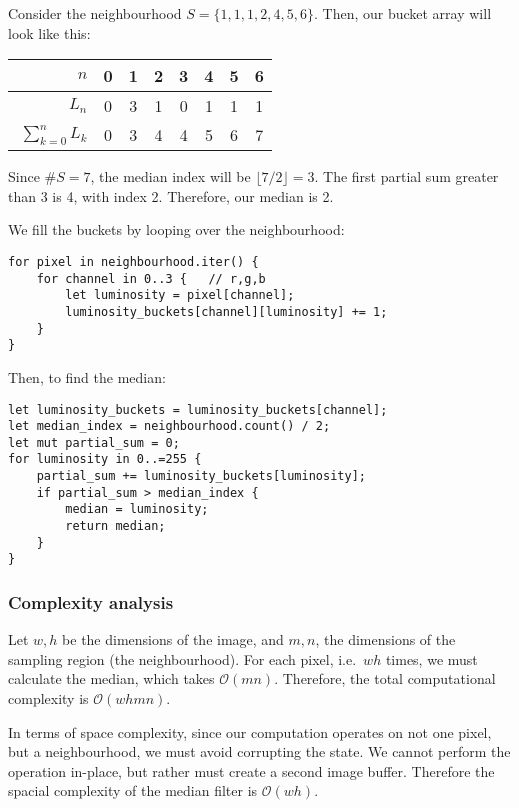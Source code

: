 \documentclass[12pt]{article}
\begin{document}
\begin{example}
    Consider the neighbourhood $S = \{1,1,1,2,4,5,6\}$.
    Then, our bucket array will look like this:
    \begin{table}[H]\centering
        \begin{tabular}{|r|c|c|c|c|c|c|c|}
            \hline
            $\phantom{\big|}n$                & 0 & 1 & 2 & 3 & 4 & 5 & 6 \\ \hline
            $\phantom{\big|}L_n$              & 0 & 3 & 1 & 0 & 1 & 1 & 1 \\ \hline\hline
            $\phantom{\Big|}\sum_{k=0}^n L_k$ & 0 & 3 & 4 & 4 & 5 & 6 & 7 \\
            \hline
        \end{tabular}
    \end{table}
    Since $\#S = 7$, the median index will be $\lfloor 7/2 \rfloor = 3$.
    The first partial sum greater than 3 is 4, with index 2. Therefore, our median is 2.
\end{example}

We fill the buckets by looping over the neighbourhood:
\begin{lstlisting}
for pixel in neighbourhood.iter() {
    for channel in 0..3 {   // r,g,b
        let luminosity = pixel[channel];
        luminosity_buckets[channel][luminosity] += 1;
    }
}
\end{lstlisting}

Then, to find the median:
\begin{lstlisting}
let luminosity_buckets = luminosity_buckets[channel];
let median_index = neighbourhood.count() / 2;
let mut partial_sum = 0;
for luminosity in 0..=255 {
    partial_sum += luminosity_buckets[luminosity];
    if partial_sum > median_index {
        median = luminosity;
        return median;
    }
}

\end{lstlisting}


\subsubsection{Complexity analysis}

Let $w,h$ be the dimensions of the image, and $m,n$, the dimensions of the sampling region (the neighbourhood).
For each pixel, i.e.\ $wh$ times, we must calculate the median, which takes $\mathcal{O}(mn)$.
Therefore, the total computational complexity is $\mathcal{O}(whmn)$.

In terms of space complexity, since our computation operates on not one pixel, but a neighbourhood, we must avoid corrupting the state.
We cannot perform the operation in-place, but rather must create a second image buffer.
Therefore the spacial complexity of the median filter is $\mathcal{O}(wh)$.
\end{document}
